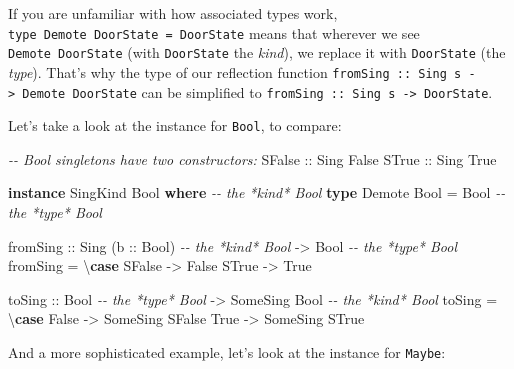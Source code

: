 \documentclass[]{article}
\newenvironment{Shaded}{}{}
\newcommand{\CommentTok}[1]{\textcolor[rgb]{0.38,0.63,0.69}{\textit{#1}}}
\newcommand{\DataTypeTok}[1]{\textcolor[rgb]{0.56,0.13,0.00}{#1}}
\newcommand{\KeywordTok}[1]{\textcolor[rgb]{0.00,0.44,0.13}{\textbf{#1}}}
\newcommand{\NormalTok}[1]{#1}
\newcommand{\OtherTok}[1]{\textcolor[rgb]{0.00,0.44,0.13}{#1}}
\begin{document}
If you are unfamiliar with how associated types work,
\texttt{type\ Demote\ DoorState\ =\ DoorState} means that wherever we see
\texttt{Demote\ DoorState} (with \texttt{DoorState} the \emph{kind}), we replace
it with \texttt{DoorState} (the \emph{type}). That's why the type of our
reflection function
\texttt{fromSing\ ::\ Sing\ s\ -\textgreater{}\ Demote\ DoorState} can be
simplified to \texttt{fromSing\ ::\ Sing\ s\ -\textgreater{}\ DoorState}.

Let's take a look at the instance for \texttt{Bool}, to compare:

\begin{Shaded}
\begin{Highlighting}[]
\CommentTok{{-}{-} Bool singletons have two constructors:}
\DataTypeTok{SFalse}\OtherTok{ ::} \DataTypeTok{Sing} \DataTypeTok{\textquotesingle{}False}
\DataTypeTok{STrue}\OtherTok{  ::} \DataTypeTok{Sing} \DataTypeTok{\textquotesingle{}True}

\KeywordTok{instance} \DataTypeTok{SingKind} \DataTypeTok{Bool} \KeywordTok{where}    \CommentTok{{-}{-} the *kind* Bool}
    \KeywordTok{type} \DataTypeTok{Demote} \DataTypeTok{Bool} \OtherTok{=} \DataTypeTok{Bool}     \CommentTok{{-}{-} the *type* Bool}

\NormalTok{    fromSing}
\OtherTok{        ::} \DataTypeTok{Sing}\NormalTok{ (}\OtherTok{b ::} \DataTypeTok{Bool}\NormalTok{)        }\CommentTok{{-}{-} the *kind* Bool}
        \OtherTok{{-}\textgreater{}} \DataTypeTok{Bool}                    \CommentTok{{-}{-} the *type* Bool}
\NormalTok{    fromSing }\OtherTok{=}\NormalTok{ \textbackslash{}}\KeywordTok{case}
        \DataTypeTok{SFalse} \OtherTok{{-}\textgreater{}} \DataTypeTok{False}
        \DataTypeTok{STrue}  \OtherTok{{-}\textgreater{}} \DataTypeTok{True}

\NormalTok{    toSing}
\OtherTok{        ::} \DataTypeTok{Bool}                    \CommentTok{{-}{-} the *type* Bool}
        \OtherTok{{-}\textgreater{}} \DataTypeTok{SomeSing} \DataTypeTok{Bool}           \CommentTok{{-}{-} the *kind* Bool}
\NormalTok{    toSing }\OtherTok{=}\NormalTok{ \textbackslash{}}\KeywordTok{case}
        \DataTypeTok{False} \OtherTok{{-}\textgreater{}} \DataTypeTok{SomeSing} \DataTypeTok{SFalse}
        \DataTypeTok{True}  \OtherTok{{-}\textgreater{}} \DataTypeTok{SomeSing} \DataTypeTok{STrue}
\end{Highlighting}
\end{Shaded}

And a more sophisticated example, let's look at the instance for \texttt{Maybe}:
\end{document}
